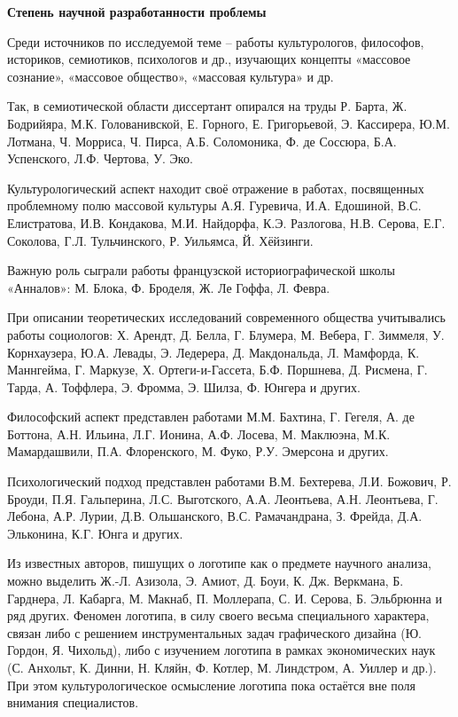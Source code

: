 \textbf{Степень научной разработанности проблемы}

Среди источников по исследуемой теме – работы культурологов, философов, историков, семиотиков, психологов и др., изучающих концепты «массовое сознание», «массовое общество», «массовая культура» и др.

Так, в семиотической области диссертант опирался на труды Р. Барта, Ж. Бодрийяра, М.К. Голованивской, Е. Горного, Е. Григорьевой, Э. Кассирера, Ю.М. Лотмана, Ч. Морриса, Ч. Пирса, А.Б. Соломоника, Ф. де Соссюра, Б.А. Успенского, Л.Ф. Чертова, У. Эко.

Культурологический аспект находит своё отражение в работах, посвященных проблемному полю массовой культуры А.Я. Гуревича, И.А. Едошиной, В.С. Елистратова, И.В. Кондакова, М.И. Найдорфа, К.Э. Разлогова, Н.В. Серова, Е.Г. Соколова, Г.Л. Тульчинского, Р. Уильямса, Й. Хёйзинги.

Важную роль сыграли работы французской историографической школы «Анналов»: М. Блока, Ф. Броделя, Ж. Ле Гоффа, Л. Февра.

При описании теоретических исследований современного общества учитывались работы социологов: Х. Арендт, Д. Белла, Г. Блумера, М. Вебера, Г. Зиммеля, У. Корнхаузера, Ю.А. Левады, Э. Ледерера, Д. Макдональда, Л. Мамфорда, К. Маннгейма, Г. Маркузе, Х. Ортеги-и-Гассета, Б.Ф. Поршнева, Д. Рисмена, Г. Тарда, А. Тоффлера, Э. Фромма, Э. Шилза, Ф. Юнгера и других.

Философский аспект представлен работами М.М. Бахтина, Г. Гегеля, А. де Боттона, А.Н. Ильина, Л.Г. Ионина, А.Ф. Лосева, М. Маклюэна, М.К. Мамардашвили, П.А. Флоренского, М. Фуко, Р.У. Эмерсона и других.

Психологический подход представлен работами В.М. Бехтерева, Л.И. Божович, Р. Броуди, П.Я. Гальперина, Л.С. Выготского, А.А. Леонтьева, А.Н. Леонтьева, Г. Лебона, А.Р. Лурии, Д.В. Ольшанского, В.С. Рамачандрана, З. Фрейда, Д.А. Эльконина, К.Г. Юнга и других.

Из известных авторов, пишущих о логотипе как о предмете научного анализа, можно выделить Ж.-Л. Азизола, Э. Амиот, Д. Боуи, К. Дж. Веркмана, Б. Гарднера, Л. Кабарга, М. Макнаб, П. Моллерапа, С. И. Серова, Б. Эльбрюнна и ряд других. Феномен логотипа, в силу своего весьма специального характера, связан либо с решением инструментальных задач графического дизайна (Ю. Гордон, Я. Чихольд), либо с изучением логотипа в рамках экономических наук (С. Анхольт, К. Динни, Н. Кляйн, Ф. Котлер, М. Линдстром, А. Уиллер и др.). При этом культурологическое осмысление логотипа пока остаётся вне поля внимания специалистов.

